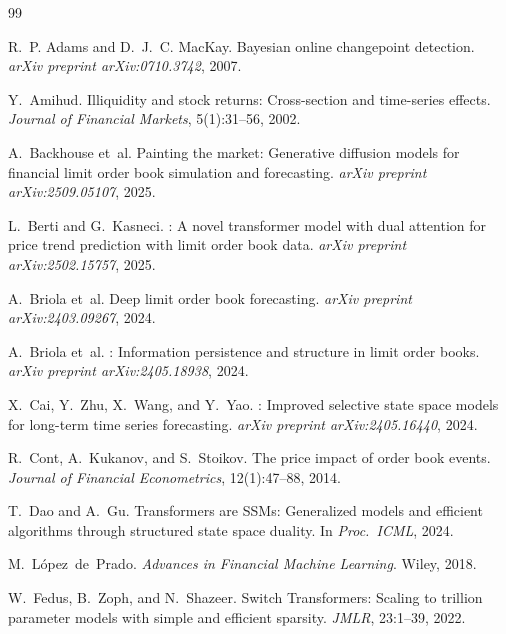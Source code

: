 \documentclass{article}
\begin{document}
\begin{thebibliography}{99}

R.~P. Adams and D.~J.~C. MacKay.
\newblock Bayesian online changepoint detection.
\newblock \emph{arXiv preprint arXiv:0710.3742}, 2007.

Y.~Amihud.
\newblock Illiquidity and stock returns: Cross-section and time-series effects.
\newblock \emph{Journal of Financial Markets}, 5(1):31--56, 2002.

A.~Backhouse et~al.
\newblock Painting the market: Generative diffusion models for financial limit order book simulation and forecasting.
\newblock \emph{arXiv preprint arXiv:2509.05107}, 2025.

L.~Berti and G.~Kasneci.
: A novel transformer model with dual attention for price trend prediction with limit order book data.
\newblock \emph{arXiv preprint arXiv:2502.15757}, 2025.

A.~Briola et~al.
\newblock Deep limit order book forecasting.
\newblock \emph{arXiv preprint arXiv:2403.09267}, 2024.

A.~Briola et~al.
: Information persistence and structure in limit order books.
\newblock \emph{arXiv preprint arXiv:2405.18938}, 2024.

X.~Cai, Y.~Zhu, X.~Wang, and Y.~Yao.
: Improved selective state space models for long-term time series forecasting.
\newblock \emph{arXiv preprint arXiv:2405.16440}, 2024.

R.~Cont, A.~Kukanov, and S.~Stoikov.
\newblock The price impact of order book events.
\newblock \emph{Journal of Financial Econometrics}, 12(1):47--88, 2014.

T.~Dao and A.~Gu.
\newblock Transformers are {SSMs}: Generalized models and efficient algorithms through structured state space duality.
\newblock In \emph{Proc.\ ICML}, 2024.

M.~L\'opez~de~Prado.
\newblock \emph{Advances in Financial Machine Learning}.
\newblock Wiley, 2018.

W.~Fedus, B.~Zoph, and N.~Shazeer.
\newblock Switch {T}ransformers: Scaling to trillion parameter models with simple and efficient sparsity.
\newblock \emph{JMLR}, 23:1--39, 2022.


\end{thebibliography}
\end{document}
